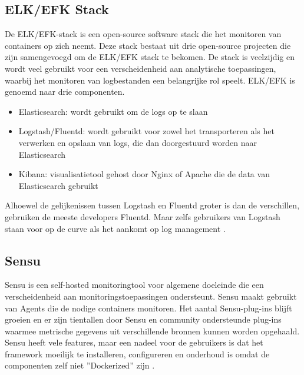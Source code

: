 \subsection{ELK/EFK Stack}

De ELK/EFK-stack is een open-source software stack die het monitoren van containers op zich neemt. Deze stack bestaat uit drie open-source projecten die zijn samengevoegd om de ELK/EFK stack te bekomen. De stack is veelzijdig en wordt veel gebruikt voor een verscheidenheid aan analytische toepassingen, waarbij het monitoren van logbestanden een belangrijke rol speelt. ELK/EFK is genoemd naar drie componenten.

\begin{itemize}
    \item Elasticsearch: wordt gebruikt om de logs op te slaan
    \item Logstash/Fluentd: wordt gebruikt voor zowel het transporteren als het verwerken en opslaan van logs, die dan doorgestuurd worden naar Elasticsearch
    \item Kibana: visualisatietool gehost door Nginx of Apache die de data van Elasticsearch gebruikt
\end{itemize}

Alhoewel de gelijkenissen tussen Logstash en Fluentd groter is dan de verschillen, gebruiken de meeste developers Fluentd. Maar zelfs gebruikers van Logstash staan voor op de curve als het aankomt op log management \autocite{Sissons2021}.

\subsection{Sensu}

Sensu is een self-hosted monitoringtool voor algemene doeleinde die een verscheidenheid aan monitoringstoepassingen ondersteunt. Sensu maakt gebruikt van Agents die de nodige containers monitoren. Het aantal Sensu-plug-ins blijft groeien en er zijn tientallen door Sensu en community ondersteunde plug-ins waarmee metrische gegevens uit verschillende bronnen kunnen worden opgehaald. Sensu heeft vele features, maar een nadeel voor de gebruikers is dat het framework moeilijk te installeren, configureren en onderhoud is omdat de componenten zelf niet ''Dockerized'' zijn \autocite{Sissons2021}. 





















